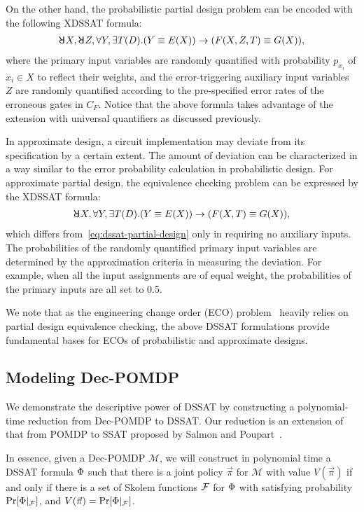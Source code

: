On the other hand,
the probabilistic partial design problem can be encoded with the following XDSSAT formula:
\begin{align}
    \label{eq:dssat-partial-design}
    \random{} X,\random{} Z,\forall Y,\exists T(D).(Y \equiv E(X)) \limply (F(X,Z,T)\equiv G(X)),
\end{align}
where the primary input variables are randomly quantified with probability $p_{x_i}$ of $x_i \in X$ to reflect their weights,
and the error-triggering auxiliary input variables $Z$ are randomly quantified according to the pre-specified error rates of the erroneous gates in $C_F$.
Notice that the above formula takes advantage of the extension with universal quantifiers as discussed previously.

In approximate design,
a circuit implementation may deviate from its specification by a certain extent.
The amount of deviation can be characterized in a way similar to the error probability calculation in probabilistic design.
For approximate partial design,
the equivalence checking problem can be expressed by the XDSSAT formula:
\begin{align}
    \label{eq:dssat-approximate-design}
    \random{} X,\forall Y,\exists T(D).(Y \equiv E(X)) \limply (F(X,T)\equiv G(X)),
\end{align}
which differs from~\cref{eq:dssat-partial-design} only in requiring no auxiliary inputs.
The probabilities of the randomly quantified primary input variables are determined by the approximation criteria in measuring the deviation.
For example, when all the input assignments are of equal weight,
the probabilities of the primary inputs are all set to 0.5.

We note that as the engineering change order (ECO) problem~\cite{JiangDATE20ECOSurvey} heavily relies on partial design equivalence checking,
the above DSSAT formulations provide fundamental bases for ECOs of probabilistic and approximate designs.

\subsection{Modeling Dec-POMDP}
We demonstrate the descriptive power of DSSAT by constructing a polynomial-time reduction from Dec-POMDP to DSSAT.
Our reduction is an extension of that from POMDP to SSAT proposed by Salmon and Poupart~\cite{Salmon2020}.

In essence, given a Dec-POMDP $\mathcal{M}$,
we will construct in polynomial time a DSSAT formula $\Phi$
such that there is a joint policy $\vec{\pi}$ for $\mathcal{M}$ with value $V(\vec{\pi})$
if and only if there is a set of Skolem functions $\mathcal{F}$ for $\Phi$
with satisfying probability $\Pr[\Phi|_{\mathcal{F}}]$, and $V(\vec{\pi})=\Pr[\Phi|_{\mathcal{F}}]$.

